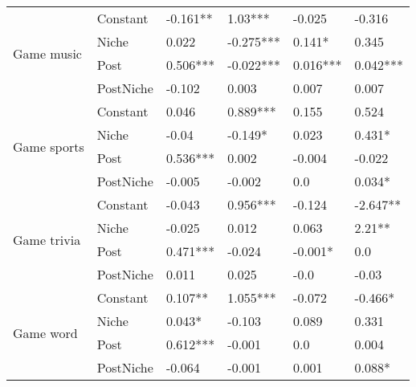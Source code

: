 \begin{longtable}[h!]{llllll}
\cline{1-6}
\multirow{4}{*}{Game music} & Constant &            -0.161** &     1.03*** &     -0.025 &     -0.316 \\
          & Niche &               0.022 &   -0.275*** &     0.141* &      0.345 \\
          & Post &            0.506*** &   -0.022*** &   0.016*** &   0.042*** \\
          & PostNiche &              -0.102 &       0.003 &      0.007 &      0.007 \\
\cline{1-6}
\multirow{4}{*}{Game sports} & Constant &               0.046 &    0.889*** &      0.155 &      0.524 \\
          & Niche &               -0.04 &     -0.149* &      0.023 &     0.431* \\
          & Post &            0.536*** &       0.002 &     -0.004 &     -0.022 \\
          & PostNiche &              -0.005 &      -0.002 &        0.0 &     0.034* \\
\cline{1-6}
\multirow{4}{*}{Game trivia} & Constant &              -0.043 &    0.956*** &     -0.124 &   -2.647** \\
          & Niche &              -0.025 &       0.012 &      0.063 &     2.21** \\
          & Post &            0.471*** &      -0.024 &    -0.001* &        0.0 \\
          & PostNiche &               0.011 &       0.025 &       -0.0 &      -0.03 \\
\cline{1-6}
\multirow{4}{*}{Game word} & Constant &             0.107** &    1.055*** &     -0.072 &    -0.466* \\
          & Niche &              0.043* &      -0.103 &      0.089 &      0.331 \\
          & Post &            0.612*** &      -0.001 &        0.0 &      0.004 \\
          & PostNiche &              -0.064 &      -0.001 &      0.001 &     0.088* \\
\end{longtable}
